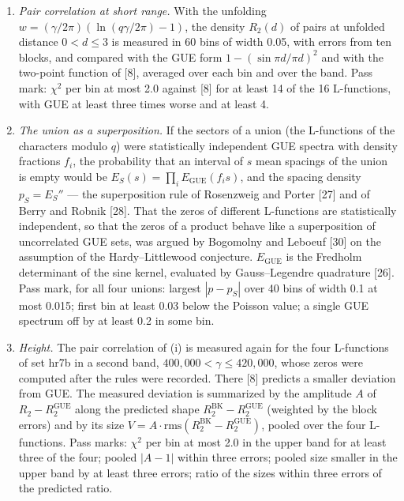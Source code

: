 \documentclass[
  10pt,
]{article}
\begin{document}
\begin{enumerate}
\def\labelenumi{(\roman{enumi})}
\item
  \emph{Pair correlation at short range.} With the unfolding
  \(w = (\gamma/2\pi)(\ln(q\gamma/2\pi) - 1)\), the density \(R_2(d)\)
  of pairs at unfolded distance \(0 < d \le 3\) is measured in 60 bins
  of width 0.05, with errors from ten blocks, and compared with the GUE
  form \(1 - (\sin\pi d/\pi d)^2\) and with the two-point function of
  {[}8{]}, averaged over each bin and over the band. Pass mark:
  \(\chi^2\) per bin at most 2.0 against {[}8{]} for at least 14 of the
  16 L-functions, with GUE at least three times worse and at least 4.
\item
  \emph{The union as a superposition.} If the sectors of a union (the
  L-functions of the characters modulo \(q\)) were statistically
  independent GUE spectra with density fractions \(f_i\), the
  probability that an interval of \(s\) mean spacings of the union is
  empty would be \(E_S(s) = \prod_i E_\mathrm{GUE}(f_i s)\), and the
  spacing density \(p_S = E_S''\) --- the superposition rule of
  Rosenzweig and Porter {[}27{]} and of Berry and Robnik {[}28{]}. That
  the zeros of different L-functions are statistically independent, so
  that the zeros of a product behave like a superposition of
  uncorrelated GUE sets, was argued by Bogomolny and Leboeuf {[}30{]} on
  the assumption of the Hardy--Littlewood conjecture. \(E_\mathrm{GUE}\)
  is the Fredholm determinant of the sine kernel, evaluated by
  Gauss--Legendre quadrature {[}26{]}. Pass mark, for all four unions:
  largest \(|p - p_S|\) over 40 bins of width 0.1 at most 0.015; first
  bin at least 0.03 below the Poisson value; a single GUE spectrum off
  by at least 0.2 in some bin.
\item
  \emph{Height.} The pair correlation of (i) is measured again for the
  four L-functions of set hr7b in a second band,
  \(400{,}000 < \gamma \le 420{,}000\), whose zeros were computed after
  the rules were recorded. There {[}8{]} predicts a smaller deviation
  from GUE. The measured deviation is summarized by the amplitude \(A\)
  of \(R_2 - R_2^\mathrm{GUE}\) along the predicted shape
  \(R_2^\mathrm{BK} - R_2^\mathrm{GUE}\) (weighted by the block errors)
  and by its size
  \(V = A\cdot\mathrm{rms}(R_2^\mathrm{BK} - R_2^\mathrm{GUE})\), pooled
  over the four L-functions. Pass marks: \(\chi^2\) per bin at most 2.0
  in the upper band for at least three of the four; pooled \(|A - 1|\)
  within three errors; pooled size smaller in the upper band by at least
  three errors; ratio of the sizes within three errors of the predicted
  ratio.
\end{enumerate}
\end{document}
